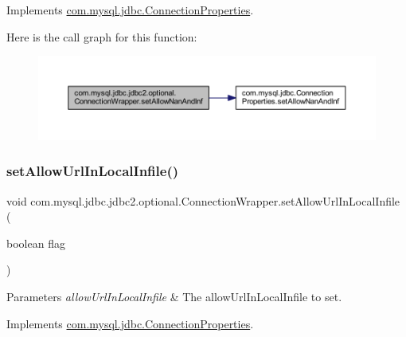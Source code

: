 Implements \mbox{\hyperlink{interfacecom_1_1mysql_1_1jdbc_1_1_connection_properties_aed2f8233f5faee7186e807c4f737b12d}{com.\+mysql.\+jdbc.\+Connection\+Properties}}.

Here is the call graph for this function\+:
\nopagebreak
\begin{figure}[H]
\begin{center}
\leavevmode
\includegraphics[width=350pt]{classcom_1_1mysql_1_1jdbc_1_1jdbc2_1_1optional_1_1_connection_wrapper_a3c630aa077ada90cbaf48a4653043fe5_cgraph}
\end{center}
\end{figure}
\mbox{\label{classcom_1_1mysql_1_1jdbc_1_1jdbc2_1_1optional_1_1_connection_wrapper_ae47387cb708cc1dfa15cda434a2738aa}} 
\subsubsection{\texorpdfstring{set\+Allow\+Url\+In\+Local\+Infile()}{setAllowUrlInLocalInfile()}}
{\footnotesize\ttfamily void com.\+mysql.\+jdbc.\+jdbc2.\+optional.\+Connection\+Wrapper.\+set\+Allow\+Url\+In\+Local\+Infile (\begin{DoxyParamCaption}\item[{boolean}]{flag }\end{DoxyParamCaption})}


\begin{DoxyParams}{Parameters}
{\em allow\+Url\+In\+Local\+Infile} & The allow\+Url\+In\+Local\+Infile to set. \\
\hline
\end{DoxyParams}


Implements \mbox{\hyperlink{interfacecom_1_1mysql_1_1jdbc_1_1_connection_properties_ad7e99f72c64f4572e9952747489da7b4}{com.\+mysql.\+jdbc.\+Connection\+Properties}}.


